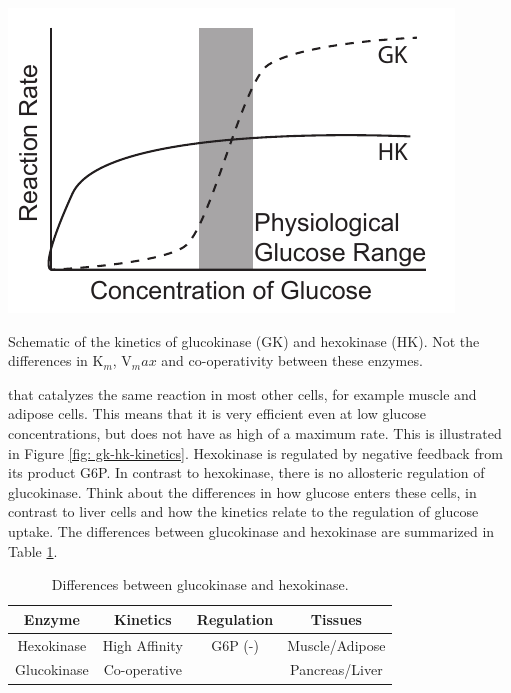 \documentclass{tufte-handout}
\begin{document}
\begin{marginfigure}
\includegraphics{figures/gk-hk-kinetics.pdf}
\caption{Schematic of the kinetics of glucokinase (GK) and hexokinase (HK).  Not the differences in K$_m$, V$_max$ and co-operativity between these enzymes.}
\label{fig:gk-hk-kinetics}
\end{marginfigure}

 that catalyzes the same reaction in most other cells, for example muscle and adipose cells.  This means that it is very efficient even at low glucose concentrations, but does not have as high of a maximum rate.  This is illustrated in Figure \ref{fig: gk-hk-kinetics}.  Hexokinase is regulated by negative feedback from its product G6P.  In contrast to hexokinase, there is no allosteric regulation of glucokinase.  Think about the differences in how glucose enters these cells, in contrast to liver cells and how the kinetics relate to the regulation of glucose uptake.  The differences between glucokinase and hexokinase are summarized in Table \ref{tab:glucokinase}.

\begin{table}
\centering
\caption{Differences between glucokinase and hexokinase.}
\label{tab:glucokinase}
\begin{tabular}{cccc}
\hline
\textbf {Enzyme} & \textbf{Kinetics}  & \textbf{Regulation}  & \textbf{Tissues}\\
\hline
Hexokinase & High Affinity & G6P (-) & Muscle/Adipose\\
Glucokinase & Co-operative & & Pancreas/Liver\\

\hline
\end{tabular}
\end{table}
\end{document}
